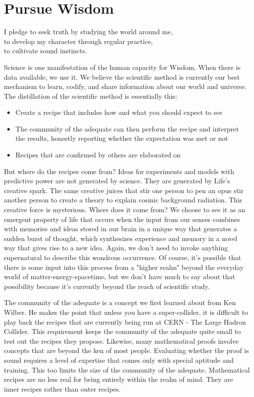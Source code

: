 \documentclass[ebook,12pt,openany,twoside]{memoir}
\begin{document}
\chapter{Pursue Wisdom}
\setlength\epigraphwidth{3.8in}
\epigraph{
  I pledge to seek truth by studying the world around me,\\
  to develop my character through regular practice,\\
  to cultivate sound instincts.
}{}

\noindent Science is one manifestation of the
human capacity for Wisdom. When there is data available, we use it. We believe the scientific method is
currently our best mechanism to learn, codify, and share information about our
world and universe. The distillation of the scientific method is essentially
this:
\begin{itemize}[\textbullet]
\item Create a recipe that includes how and what you should expect to see

\item The community of the adequate can then perform the recipe and interpret
the results, honestly reporting whether the expectation was met or not

\item Recipes that are confirmed by others are elaborated on
\end{itemize}


But where do the recipes come from? Ideas for experiments and models with
predictive power are not generated by science. They are generated by Life's
creative spark. The same creative juices that stir one person to pen an opus
stir another person to create a theory to explain cosmic background radiation.
This creative force is mysterious. Where does it come from? We choose to see it
as an emergent property of life that occurs when the input from our senses
combines with memories and ideas stored in our brain in a unique way that
generates a sudden burst of thought, which synthesizes experience and memory in
a novel way that gives rise to a new idea. Again, we don't need to invoke
anything supernatural to describe this wondrous occurrence. Of course, it's
possible that there is some input into this process from a "higher realm"
beyond the everyday world of matter-energy-spacetime, but we don't have much to
say about that possibility because it's currently beyond the reach of
scientific study.

The community of the adequate is a concept we first learned about from Ken
Wilber. He makes the point that unless you have a super-collider, it is
difficult to play back the recipes that are currently being run at CERN - The
Large Hadron Collider. This requirement keeps the community of the adequate
quite small to test out the recipes they propose. Likewise, many mathematical
proofs involve concepts that are beyond the ken of most people. Evaluating
whether the proof is sound requires a level of expertise that comes only with
special aptitude and training. This too limits the size of the community of the
adequate. Mathematical recipes are no less real for being entirely within the
realm of mind. They are inner recipes rather than outer recipes.
\end{document}
